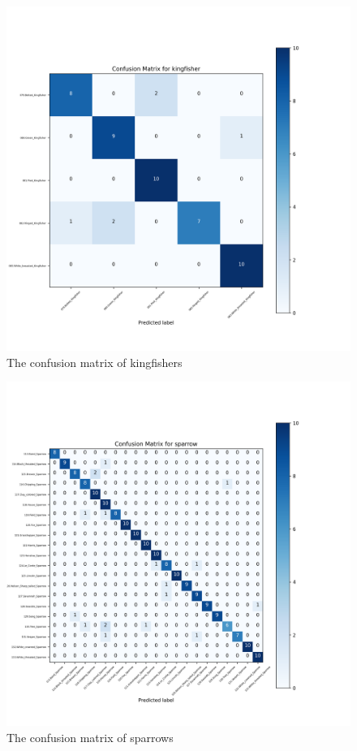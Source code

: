 \documentclass[twocolumn]{extarticle}
\begin{document}
\begin{figure}[H]
\centering
\includegraphics[width=0.95\linewidth]{figure/eval_high_temp_kingfisher}
\caption{The confusion matrix of kingfishers}
\label{fig:evalhightempkingfisher}
\end{figure}
\begin{figure}[H]
\centering
\includegraphics[width=0.95\linewidth]{figure/eval_high_temp_sparrow}
\caption{The confusion matrix of sparrows}
\label{fig:evalhightempsparrow}
\end{figure}
\end{document}
